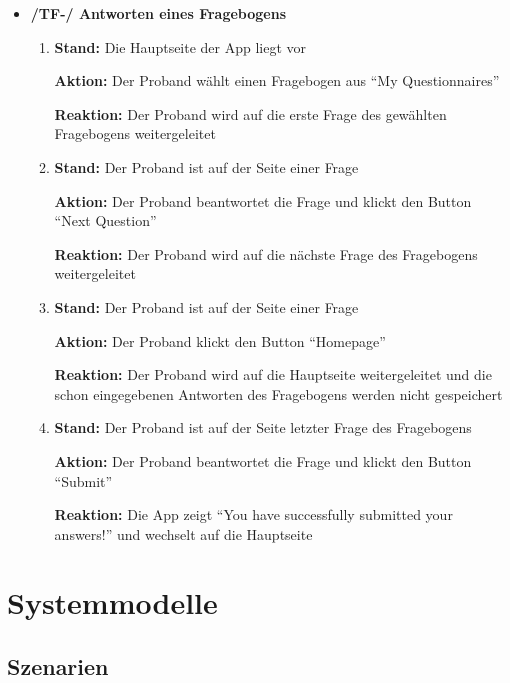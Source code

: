 \documentclass[a4paper]{scrreprt}
\begin{document}
\begin{itemize}
	        \item \textbf{/TF-/ Antworten eines Fragebogens}
	        \begin{enumerate}
	        	\item \par \textbf{Stand: }Die Hauptseite der App liegt vor
	        	\par \textbf{Aktion: }Der \gls{Proband} wählt einen Fragebogen aus ``My Questionnaires''
	        	\par \textbf{Reaktion: }Der \gls{Proband} wird auf die erste Frage des gewählten Fragebogens weitergeleitet
	        	\item \par \textbf{Stand: }Der \gls{Proband} ist auf der Seite einer Frage
	        	\par \textbf{Aktion: }Der \gls{Proband} beantwortet die Frage und klickt den Button ``Next Question''
	        	\par \textbf{Reaktion: }Der \gls{Proband} wird auf die nächste Frage des Fragebogens weitergeleitet
	        	\item \par \textbf{Stand: }Der \gls{Proband} ist auf der Seite einer Frage
	        	\par \textbf{Aktion: }Der \gls{Proband} klickt den Button ``Homepage''
	        	\par \textbf{Reaktion: }Der \gls{Proband} wird auf die Hauptseite weitergeleitet und die schon eingegebenen Antworten des Fragebogens werden nicht gespeichert
	        	\item \par \textbf{Stand: }Der \gls{Proband} ist auf der Seite letzter Frage des Fragebogens
	        	\par \textbf{Aktion: }Der \gls{Proband} beantwortet die Frage und klickt den Button ``Submit''
	        	\par \textbf{Reaktion: }Die App zeigt ``You have successfully submitted your answers!'' und wechselt auf die Hauptseite
	        \end{enumerate}

            \end{itemize}

    \chapter{Systemmodelle}

        \section{Szenarien}
\end{document}
